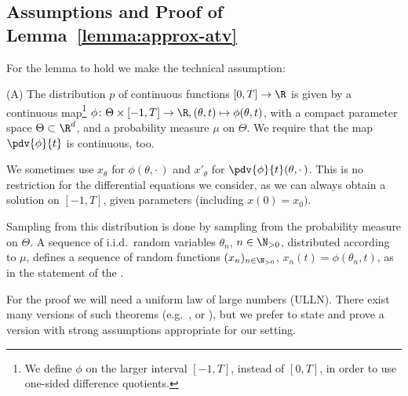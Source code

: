 

\subsection{Assumptions and Proof of Lemma~\ref{lemma:approx-atv}}
For the lemma to hold we make the technical assumption:

(A) The distribution $p$ of continuous functions $[0,T]\to \R$ is given by %
a continuous map\footnote{%
	We define $\phi$ on the larger interval $[-1,T]$, instead of $[0,T]$, in order to use one-sided difference quotients.
} ${\phi\colon\Theta\times[-1,T]\to \R, (\theta,t)\mapsto \phi(\theta,t)}$,
with a compact parameter space $\Theta\subset \R^d$,
and a probability measure $\mu$ on $\Theta$.
We require that the map $\pdv{\phi}{t}$ is continuous, too.

We sometimes use $x_\theta$ for $\phi(\theta,\cdot\,)$  and $x'_\theta$ for $\pdv{\phi}{t}(\theta,\cdot\,)$.
This is no restriction for the differential
equations we consider, as we can always obtain a solution on $[-1,T]$, given parameters (including  $x(0)=x_0)$.

Sampling from this distribution is done by sampling from the probability measure on $\Theta$.
A sequence of i.i.d.\ random variables $\theta_n$, $n\in\N_{>0}$, distributed according to $\mu$, defines a sequence of random functions $(x_n)_{n\in\N_{>0}}$, $x_n(t) = \phi(\theta_n, t)$,
as in the statement of the .

For the proof we will need a uniform law of large numbers (ULLN).
There exist many versions of such theorems
(e.g.\ \citep{jennrich_asymptotic_properties_non-linear_1969}, or \citep{andrews_consistency_1987}),
but we prefer to state and prove a version with strong assumptions appropriate for our setting.

